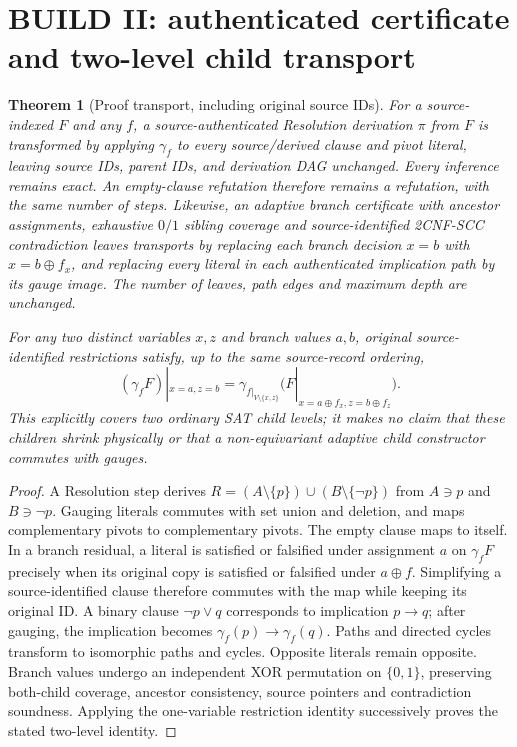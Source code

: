 \documentclass[11pt]{article}
\newtheorem{theorem}{Theorem}
\begin{document}
\section{BUILD II: authenticated certificate and two-level child transport}
\begin{theorem}[Proof transport, including original source IDs]\label{t:transport}
For a source-indexed $F$ and any $f$, a source-authenticated Resolution derivation $\pi$ from $F$ is transformed by applying $\gamma_f$ to every source/derived clause and pivot literal, leaving source IDs, parent IDs, and derivation DAG unchanged. Every inference remains exact. An empty-clause refutation therefore remains a refutation, with the same number of steps. Likewise, an adaptive branch certificate with ancestor assignments, exhaustive $0/1$ sibling coverage and source-identified 2CNF-SCC contradiction leaves transports by replacing each branch decision $x=b$ with $x=b\oplus f_x$, and replacing every literal in each authenticated implication path by its gauge image. The number of leaves, path edges and maximum depth are unchanged.

For any two distinct variables $x,z$ and branch values $a,b$, original source-identified restrictions satisfy, up to the same source-record ordering,
\[
(\gamma_f F)|_{x=a,z=b}
=\gamma_{f|_{V\setminus\{x,z\}}}\bigl(F|_{x=a\oplus f_x,z=b\oplus f_z}\bigr).
\]
This explicitly covers two ordinary SAT child levels; it makes no claim that these children shrink physically or that a non-equivariant adaptive child constructor commutes with gauges.
\end{theorem}
\begin{proof}
A Resolution step derives $R=(A\setminus\{p\})\cup(B\setminus\{\neg p\})$ from $A\ni p$ and $B\ni\neg p$. Gauging literals commutes with set union and deletion, and maps complementary pivots to complementary pivots. The empty clause maps to itself. In a branch residual, a literal is satisfied or falsified under assignment $a$ on $\gamma_f F$ precisely when its original copy is satisfied or falsified under $a\oplus f$. Simplifying a source-identified clause therefore commutes with the map while keeping its original ID. A binary clause $\neg p\vee q$ corresponds to implication $p\rightarrow q$; after gauging, the implication becomes $\gamma_f(p)\rightarrow\gamma_f(q)$. Paths and directed cycles transform to isomorphic paths and cycles. Opposite literals remain opposite. Branch values undergo an independent XOR permutation on $\{0,1\}$, preserving both-child coverage, ancestor consistency, source pointers and contradiction soundness. Applying the one-variable restriction identity successively proves the stated two-level identity.
\end{proof}
\end{document}
